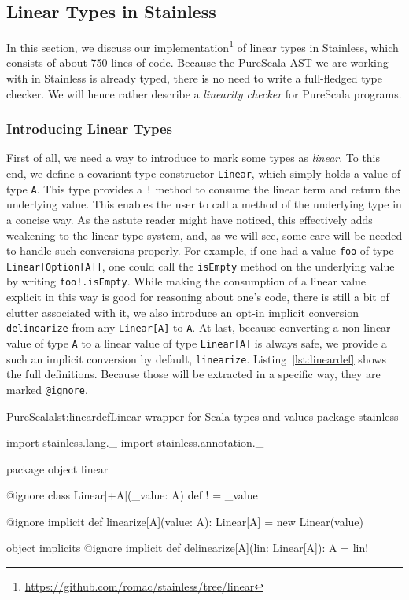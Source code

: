 \documentclass[a4paper,twoside]{article}
\newcommand{\RefCode}[1]{Listing~\ref{#1}}
\newcommand{\stt}[1]{\texttt{\small{#1}}}
\begin{document}
\subsection{Linear Types in Stainless}

\newcommand{\lin}[1]{\stt{Linear[#1]}}

In this section, we discuss our implementation\footnote{\url{https://github.com/romac/stainless/tree/linear}} of linear types in Stainless, which consists of about 750 lines of code. Because the PureScala AST we are working with in Stainless is already typed, there is no need to write a full-fledged type checker. We will hence rather describe a \textit{linearity checker} for PureScala programs.

\subsubsection{Introducing Linear Types}

First of all, we need a way to introduce to mark some types as \textit{linear}. To this end, we define a covariant type constructor \stt{Linear}, which simply holds a value of type \stt{A}. This type provides a \stt{!} method to consume the linear term and return the underlying value. This enables the user to call a method of the underlying type in a concise way. As the astute reader might have noticed, this effectively adds weakening to the linear type system, and, as we will see, some care will be needed to handle such conversions properly. For example, if one had a value \stt{foo} of type \stt{Linear[Option[A]]}, one could call the \stt{isEmpty} method on the underlying value by writing \stt{foo!.isEmpty}. While making the consumption of a linear value explicit in this way is good for reasoning about one's code, there is still a bit of clutter associated with it, we also introduce an opt-in implicit conversion \stt{delinearize} from any \stt{Linear[A]} to \stt{A}. At last, because converting a non-linear value of type \stt{A} to a linear value of type \stt{Linear[A]} is always safe, we provide a such an implicit conversion by default, \stt{linearize}. \RefCode{lst:lineardef} shows the full definitions. Because those will be extracted in a specific way, they are marked \stt{@ignore}.

\begin{Code}{PureScala}{lst:lineardef}{Linear wrapper for Scala types and values}
package stainless

import stainless.lang._
import stainless.annotation._

package object linear {

  @ignore
  class Linear[+A](_value: A) {
    def ! = _value
  }
  
  @ignore
  implicit def linearize[A](value: A): Linear[A] = new Linear(value)
  
  object implicits {
    @ignore
    implicit def delinearize[A](lin: Linear[A]): A = lin!
  }
}
\end{Code}
\end{document}
